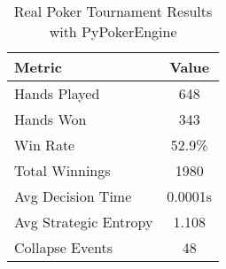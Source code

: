 \begin{table}[h]
\centering
\caption{Real Poker Tournament Results with PyPokerEngine}
\begin{tabular}{|l|c|}
\hline
Metric & Value \\
\hline
Hands Played & 648 \\
Hands Won & 343 \\
Win Rate & 52.9\% \\
Total Winnings & 1980 \\
Avg Decision Time & 0.0001s \\
Avg Strategic Entropy & 1.108 \\
Collapse Events & 48 \\
\hline
\end{tabular}
\end{table}